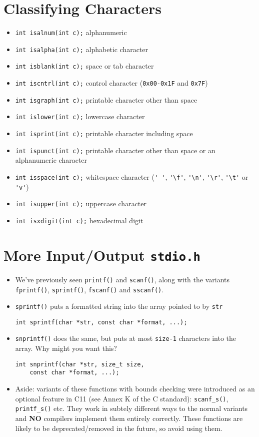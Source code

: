 \documentclass{article}
\begin{document}
\section{Classifying Characters}
\begin{itemize}
\item \verb!int isalnum(int c);! alphanumeric
\item \verb!int isalpha(int c);! alphabetic character
\item \verb!int isblank(int c);! space or tab character
\item \verb!int iscntrl(int c);! control character (\verb!0x00-0x1F! and \verb!0x7F!)
\item \verb!int isgraph(int c);! printable character other than space
\item \verb!int islower(int c);! lowercase character
\item \verb!int isprint(int c);! printable character including space
\item \verb!int ispunct(int c);! printable character other than space or an alphanumeric character
\item \verb!int isspace(int c);! whitespace character (\verb!' '!, \verb!'\f'!, \verb!'\n'!, \verb!'\r'!, \verb!'\t'! or \verb!'v'!)
\item \verb!int isupper(int c);! uppercase character
\item \verb!int isxdigit(int c);! hexadecimal digit
\end{itemize}



\section{More Input/Output \texttt{stdio.h}}
\begin{itemize}
\item We've previously seen \verb!printf()! and \verb!scanf()!, along with the variants \verb!fprintf()!, \verb!sprintf()!, \verb!fscanf()! and \verb!sscanf()!.
\item \verb!sprintf()! puts a formatted string into the array pointed to by \verb!str!
\begin{verbatim}
int sprintf(char *str, const char *format, ...);
\end{verbatim}
\item \verb!snprintf()! does the same, but puts at most \verb!size-1! characters into the array. Why might you want this?
\begin{verbatim}
int snprintf(char *str, size_t size,
    const char *format, ...);
\end{verbatim}
\item Aside: variants of these functions with bounds checking were introduced as an optional feature in C11 (see Annex K of the C standard): \verb!scanf_s()!, \verb!printf_s()! etc. They work in subtely different ways to the normal variants and \textbf{NO} compilers implement them entirely correctly. These functions are likely to be deprecated/removed in the future, so avoid using them.
\end{itemize}
\end{document}
